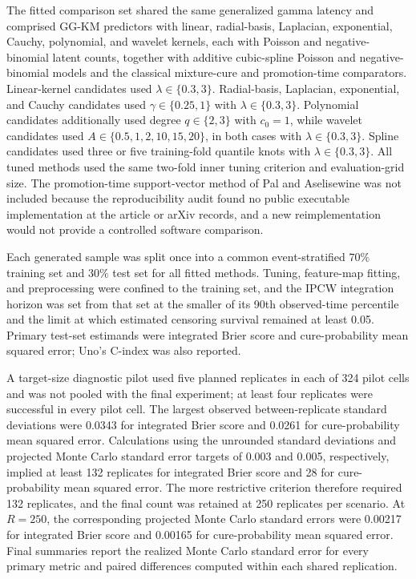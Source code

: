 The fitted comparison set shared the same generalized gamma latency and comprised
GG-KM predictors with linear, radial-basis, Laplacian, exponential, Cauchy,
polynomial, and wavelet kernels, each with Poisson and negative-binomial latent
counts, together with additive cubic-spline Poisson and negative-binomial models
and the classical mixture-cure and promotion-time comparators. Linear-kernel
candidates used $\lambda\in\{0.3,3\}$. Radial-basis, Laplacian, exponential, and
Cauchy candidates used $\gamma\in\{0.25,1\}$ with
$\lambda\in\{0.3,3\}$. Polynomial candidates additionally used
degree $q\in\{2,3\}$ with $c_0=1$, while wavelet candidates used
$A\in\{0.5,1,2,10,15,20\}$, in both cases with $\lambda\in\{0.3,3\}$.
Spline candidates used three or five training-fold quantile knots with
$\lambda\in\{0.3,3\}$. All tuned methods used the same two-fold inner tuning
criterion and evaluation-grid size. The promotion-time support-vector method of
Pal and Aselisewine was not included because the reproducibility audit found no
public executable implementation at the article or arXiv records, and a new
reimplementation would not provide a controlled software comparison.
\cite{pal2023}

Each generated sample was split once into a common event-stratified
$70\%$ training set and $30\%$ test set for all fitted methods. Tuning,
feature-map fitting, and preprocessing were confined to the training set,
and the IPCW integration horizon was set from that set at the smaller of
its 90th observed-time percentile and the limit at which estimated
censoring survival remained at least 0.05. Primary test-set estimands were
integrated Brier score and cure-probability mean squared error;
Uno's C-index was also reported.

A target-size diagnostic pilot used five planned replicates in each of
324 pilot cells and was not pooled with the final experiment; at least four
replicates were successful in every pilot cell. The largest observed
between-replicate standard deviations were 0.0343 for integrated Brier
score and 0.0261 for cure-probability mean squared error. Calculations using
the unrounded standard deviations and projected Monte Carlo standard error
targets of 0.003 and 0.005, respectively, implied at least 132 replicates
for integrated Brier score
and 28 for cure-probability mean squared error. The more restrictive
criterion therefore required 132 replicates, and the final count was retained
at 250 replicates per scenario. At
$R=250$, the corresponding projected Monte Carlo standard errors were
0.00217 for integrated Brier score and 0.00165 for cure-probability mean
squared error. Final summaries report the realized Monte Carlo
standard error for every primary metric and paired differences computed
within each shared replication.

